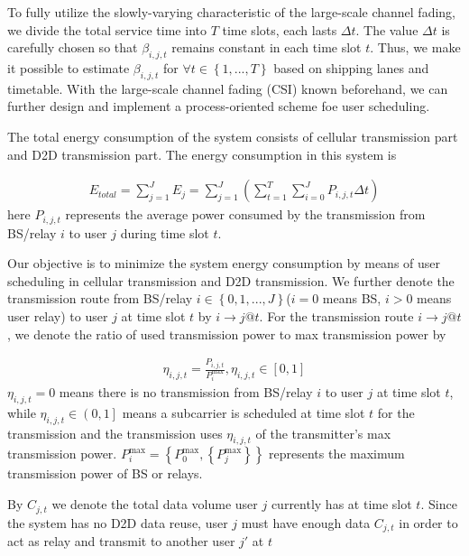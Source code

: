 \documentclass{ieeeaccess}
\begin{document}
To fully utilize the slowly-varying characteristic of the large-scale channel fading, we divide the total service time into $T$ time slots, each lasts $\Delta t$. The value $\Delta t$ is carefully chosen so that $\beta _{i,j,t}$ remains constant in each time slot $t$. Thus, we make it possible to estimate $\beta _{i,j,t}$ for $\forall t \in \left\{ {1,...,T} \right\}$ based on shipping lanes and timetable. With the large-scale channel fading (CSI) known beforehand, we can further design and implement a process-oriented scheme foe user scheduling.

The total energy consumption of the system consists of cellular transmission part and D2D transmission part. The energy consumption in this system is

\begin{align}
{{E_{total}} = \sum\limits_{j = 1}^J {{E_j}}  = \sum\limits_{j = 1}^J {\left( {\sum\limits_{t = 1}^T {\sum\limits_{i = 0}^J {{P_{i,j,t}}\Delta t} } } \right)} }
\end{align}
here ${P_{i,j,t}}$ represents the average power consumed by the transmission from BS/relay $i$ to user $j$ during time slot $t$.

Our objective is to minimize the system energy consumption by means of user scheduling in cellular transmission and D2D transmission. We further denote the transmission route from BS/relay $i \in \left\{ {0,1,...,J} \right\}$($i = 0$ means BS, $i > 0$ means user relay) to user $j$ at time slot $t$ by $i \to j@t$. For the transmission route $i \to j@t$, we denote the ratio of used transmission power to max transmission power by 

\begin{align}
{{\eta _{i,j,t}} = \frac{{{P_{i,j,t}}}}{{P_i^{\max }}},{\eta _{i,j,t}} \in \left[ {0,1} \right]}
\end{align}
${\eta _{i,j,t}} = 0$ means there is no transmission from BS/relay $i$ to user $j$ at time slot $t$, while ${\eta _{i,j,t}} \in \left( {0,1} \right]$ means a subcarrier is scheduled at time slot $t$ for the transmission and the transmission uses ${\eta _{i,j,t}}$ of the transmitter's max transmission power. $P_i^{\max } = \left\{ {P_0^{\max },\left\{ {P_j^{\max }} \right\}} \right\}$ represents the maximum transmission power of BS or relays. 

By ${C_{j,t}}$ we denote the total data volume user $j$ currently has at time slot $t$. Since the system has no D2D data reuse, user $j$ must have enough data ${C_{j,t}}$ in order to act as relay and transmit to another user $j'$ at $t$
\end{document}

